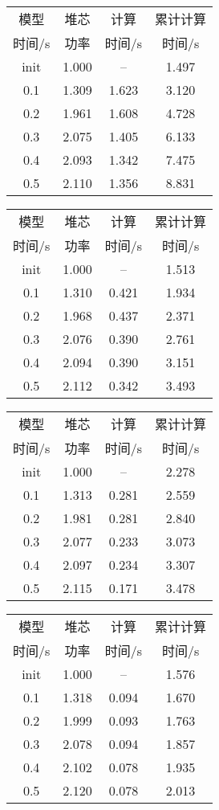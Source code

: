 \begin{table}
{
\small
\begin{tabular}{cccc}
\toprule
模型 & 堆芯 & 计算 & 累计计算\\
时间/s & 功率 & 时间/s & 时间/s\\
\midrule
init & 1.000 & -- & 1.497\\
0.1 & 1.309 & 1.623 & 3.120\\
0.2 & 1.961 & 1.608 & 4.728\\
0.3 & 2.075 & 1.405 & 6.133\\
0.4 & 2.093 & 1.342 & 7.475\\
0.5 & 2.110 & 1.356 & 8.831\\
\bottomrule
\end{tabular}
}
{
\small
\begin{tabular}{cccc}
\toprule
模型 & 堆芯 & 计算 & 累计计算\\
时间/s & 功率 & 时间/s & 时间/s\\
\midrule
init & 1.000 & -- & 1.513\\
0.1 & 1.310 & 0.421 & 1.934\\
0.2 & 1.968 & 0.437 & 2.371\\
0.3 & 2.076 & 0.390 & 2.761\\
0.4 & 2.094 & 0.390 & 3.151\\
0.5 & 2.112 & 0.342 & 3.493\\
\bottomrule
\end{tabular}
}
{
\small
\begin{tabular}{cccc}
\toprule
模型 & 堆芯 & 计算 & 累计计算\\
时间/s & 功率 & 时间/s & 时间/s\\
\midrule
init & 1.000 & -- & 2.278\\
0.1 & 1.313 & 0.281 & 2.559\\
0.2 & 1.981 & 0.281 & 2.840\\
0.3 & 2.077 & 0.233 & 3.073\\
0.4 & 2.097 & 0.234 & 3.307\\
0.5 & 2.115 & 0.171 & 3.478\\
\bottomrule
\end{tabular}
}
{
\small
\begin{tabular}{cccc}
\toprule
模型 & 堆芯 & 计算 & 累计计算\\
时间/s & 功率 & 时间/s & 时间/s\\
\midrule
init & 1.000 & -- & 1.576\\
0.1 & 1.318 & 0.094 & 1.670\\
0.2 & 1.999 & 0.093 & 1.763\\
0.3 & 2.078 & 0.094 & 1.857\\
0.4 & 2.102 & 0.078 & 1.935\\
0.5 & 2.120 & 0.078 & 2.013\\
\bottomrule
\end{tabular}
}
\end{table}

